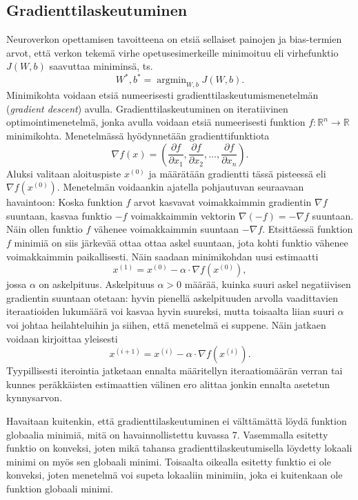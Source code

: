 \documentclass[12pt,a4paper,finnish,oneside,titlepage]{article}
\DeclareMathOperator*{\argmin}{argmin} %
\newcommand{\field}[1]{\mathbb{#1}}    %
\newcommand{\R}{\field{R}}             %
\theoremstyle{plain}
\theoremstyle{definition}
\theoremstyle{remark}
\begin{document}
\subsection{Gradienttilaskeutuminen}
Neuroverkon opettamisen tavoitteena on etsiä sellaiset painojen ja bias-termien arvot, että verkon tekemä virhe opetusesimerkeille minimoituu eli virhefunktio \(J(W, b)\) saavuttaa miniminsä, ts. \[W^*, b^* =\argmin_{W, b} J(W, b).\]
Minimikohta voidaan etsiä numeerisesti gradienttilaskeutumismenetelmän (\textit{gradient descent}) avulla. Gradienttilaskeutuminen on iteratiivinen optimointimenetelmä, jonka avulla voidaan etsiä numeerisesti funktion \(f : \R^n \to \R\) minimikohta. Menetelmässä hyödynnetään gradienttifunktiota \[\nabla f(x)=\left(\frac{\partial f}{\partial x_1}, \frac{\partial f}{\partial x_2}, \ldots, \frac{\partial f}{\partial x_n}\right).\]
Aluksi valitaan aloituspiste \(x^{(0)}\) ja määrätään gradientti tässä pisteessä eli \(\nabla f(x^{(0)})\). Menetelmän voidaankin ajatella pohjautuvan seuraavaan havaintoon: Koska funktion \(f\) arvot kasvavat voimakkaimmin gradientin \(\nabla f\) suuntaan, kasvaa funktio \(-f\) voimakkaimmin vektorin \(\nabla (-f)=-\nabla f\) suuntaan. Näin ollen funktio \(f\) vähenee voimakkaimmin suuntaan \(-\nabla f\). Etsittäessä funktion \(f\) minimiä on siis järkevää ottaa ottaa askel suuntaan, jota kohti funktio vähenee voimakkaimmin paikallisesti. Näin saadaan minimikohdan uusi estimaatti \[x^{(1)}=x^{(0)}-\alpha\cdot \nabla f(x^{(0)}),\] jossa \(\alpha\) on askelpituus. Askelpituus \(\alpha >0\) määrää, kuinka suuri askel negatiivisen gradientin suuntaan otetaan: hyvin pienellä askelpituuden arvolla vaadittavien iteraatioiden lukumäärä voi kasvaa hyvin suureksi, mutta toisaalta liian suuri \(\alpha\) voi johtaa heilahteluihin ja siihen, että menetelmä ei suppene. Näin jatkaen voidaan kirjoittaa yleisesti \[x^{(i+1)}=x^{(i)}-\alpha \cdot \nabla f(x^{(i)}).\] Tyypillisesti iterointia jatketaan ennalta määritellyn iteraatiomäärän verran tai kunnes peräkkäisten estimaattien välinen ero alittaa jonkin ennalta asetetun kynnysarvon.

Havaitaan kuitenkin, että gradienttilaskeutuminen ei välttämättä löydä funktion globaalia minimiä, mitä on havainnollistettu kuvassa 7. Vasemmalla esitetty funktio on konveksi, joten mikä tahansa gradienttilaskeutumisella löydetty lokaali minimi on myös sen globaali minimi. Toisaalta oikealla esitetty funktio ei ole konveksi, joten menetelmä voi supeta lokaaliin minimiin, joka ei kuitenkaan ole funktion globaali minimi.
\end{document}

